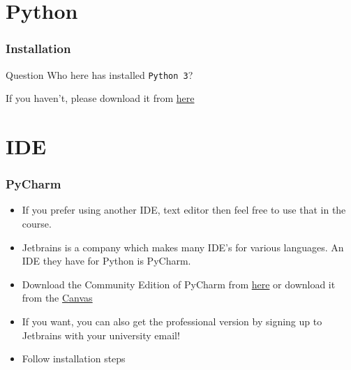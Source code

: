 \documentclass{beamer}
\begin{document}
\section{Python}
\begin{frame}
  \frametitle{Installation}
  \begin{block}{Question}
  	Who here has installed \texttt{Python 3}?    
  \end{block}
  \pause
  If you haven't, please download it from \href{https://www.python.org/downloads/}{here} 
\end{frame}
\section{IDE}
\begin{frame}
  \frametitle{PyCharm}
  \begin{itemize}
  	\item If you prefer using another IDE, text editor then feel free to use that in the course.
  	\item Jetbrains is a company which makes many IDE's for various languages. An IDE they have for Python is PyCharm.
    \item Download the Community Edition of PyCharm from \href{https://www.jetbrains.com/pycharm/}{here} or download it from the \href{https://canvas.auckland.ac.nz/files/5186494/download?download_frd=1} {Canvas}
    \item If you want, you can also get the professional version by signing up to Jetbrains with your university email!
    \item Follow installation steps
   \end{itemize}
\end{frame}
\end{document}
